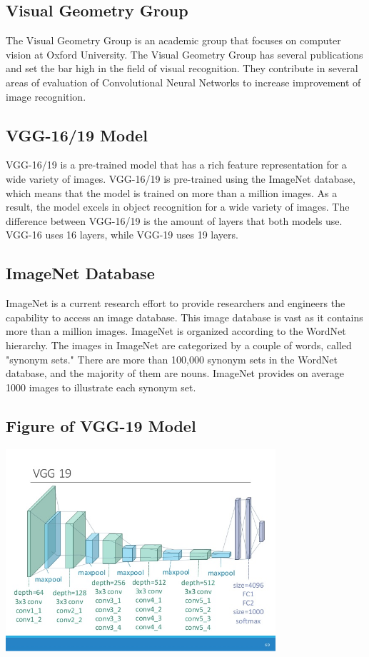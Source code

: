 \documentclass[12pt]{article}
\begin{document}
\subsection{Visual Geometry Group}
The Visual Geometry Group is an academic group that focuses on computer vision at Oxford University. The Visual Geometry Group has several publications and set the bar high in the field
of visual recognition. They contribute in several areas of evaluation of Convolutional Neural Networks to increase improvement of image recognition.

\subsection{VGG-16/19 Model}
VGG-16/19 is a pre-trained model that has a rich feature representation for a wide variety of images. VGG-16/19 is pre-trained using the ImageNet database, which means that the model is trained on more than a million images. As a result, the model excels in object recognition for a wide variety of images. The difference between VGG-16/19 is the amount of layers that both models use. VGG-16 uses 16 layers, while VGG-19 uses 19 layers.

\subsection{ImageNet Database}
ImageNet is a current research effort to provide researchers and engineers the capability to access an image database. This image database is vast as it contains more than a million images.
ImageNet is organized according to the WordNet hierarchy. The images in ImageNet are categorized by a couple of words, called "synonym sets." There are more than 100,000 synonym sets in 
the WordNet database, and the majority of them are nouns. ImageNet provides on average 1000 images to illustrate each synonym set.


\subsection{Figure of VGG-19 Model}
\begin{center}
  \includegraphics[height=75mm]{visuals/vgg-19.jpg}
\end{center}
\end{document}
